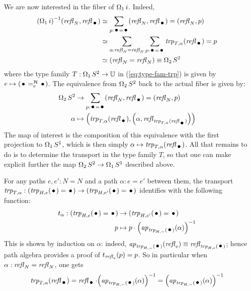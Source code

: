 \documentclass[english,a4]{article}
\def\U{\universe U}%
\begin{document}
We are now interested in the fiber of $\operatorname{\Omega_{1}} i$. Indeed,
\begin{align}
  \inv {(\loopspace 1 i)} {(\refl N,\refl\base)}
  &\weq \sum_{p:\base = \base}(\refl N,\refl\base) = (\refl N,p)
  \\
  &\weq \sum_{\alpha:\refl N = \refl N}\sum_{p:\base=\base}\trp {T,\alpha}(\refl \base)
 = p \label{eq:type-fam-trp}
  \\
  &\weq (\refl N = \refl N) \jdeq \loopspace 2 \Sp
\end{align}
where the type family $T:\loopspace 1 \Sp \to \U$ in
(\ref{eq:type-fam-trp}) is given by
$e\mapsto {(\pathover \base \hopffam e \base)}$. The equivalence from
$\operatorname{\Omega_{2}} S^2$ back to the actual fiber is given by:
\begin{equation}
  \begin{aligned}
    \loopspace 2 \Sp &\to \sum_{p:\base = \base}(\refl N,\refl\base) =
    (\refl N,p)
    \\
    \alpha &\mapsto \left(\trp{T,\alpha}(\refl\base), \left(\alpha,
        \refl{\trp{T,\alpha}(\refl\base)}\right)\right)
  \end{aligned}
\end{equation}
The map of interest is the composition of this equivalence with the
first projection to $\operatorname{\Omega_{1}} {S^1}$, which is then simply
$\alpha \mapsto \trp{T,\alpha}(\refl \base)$. All that remains to do
is to determine the transport in the type family $T$, so that one can
make explicit further the map $\operatorname{\Omega_{2}} S^2 \to \operatorname{\Omega_{1}} {S^1}$
described above.

For any paths $e,e':N=N$ and a path $\alpha: e=e'$ between them, the
transport
$\trp{T,\alpha}:(\trp{H,e}(\base) = \base) \to (\trp{H,e'}(\base) =
\base)$ identifies with the following function:
\begin{equation}
  \begin{aligned}
    {t_\alpha}: (\trp{H,e}(\base) = \base) &\to (\trp{H,e'}(\base) = \base)
    \\
    p &\mapsto p\cdot \inv{\left(\ap{\trp{H,-}(\base)}(\alpha)\right)}
  \end{aligned}
\end{equation}
This is shown by induction on $\alpha$: indeed,
$\ap{\trp{H,-}(\base)}(\refl{e}) \jdeq \refl{\trp{H,e}(\base)}$; hence
path algebra provides a proof of $t_{\mathop{{\mathit{refl}}_{e}}}(p) = p$. So in
particular when $\alpha:\mathop{{\mathit{refl}}_{N}} = \mathop{{\mathit{refl}}_{N}}$, one gets
\begin{equation}\label{eq:trp-Ta(refl)}
  \trp{T,\alpha}(\refl \base) = \refl \base \cdot \inv{\left(\ap{\trp{H,-}(\base)}(\alpha)\right)}
  = \inv{\left(\ap{\trp{H,-}(\base)}(\alpha)\right)}
\end{equation}
\end{document}
